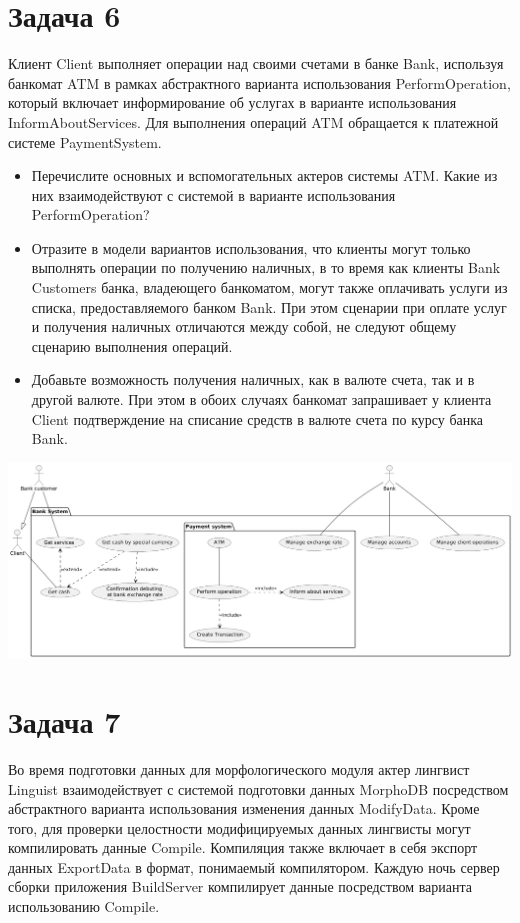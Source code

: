 \documentclass{article}
\begin{document}
\section{Задача 6}
Клиент Client выполняет операции над своими счетами в банке Bank, используя банкомат ATM в рамках абстрактного варианта использования PerformOperation, который включает информирование об услугах в варианте использования InformAboutServices. Для выполнения операций ATM обращается к платежной системе PaymentSystem.

\begin{itemize}
    \item Перечислите основных и вспомогательных актеров системы ATM. Какие из них взаимодействуют с системой в варианте использования PerformOperation?
    \item Отразите в модели вариантов использования, что клиенты могут только выполнять операции по получению наличных, в то время как клиенты Bank Customers банка, владеющего банкоматом, могут также оплачивать услуги из списка, предоставляемого банком Bank. При этом сценарии при оплате услуг и получения наличных отличаются между собой, не следуют общему сценарию выполнения операций.
    \item Добавьте возможность получения наличных, как в валюте счета, так и в другой валюте. При этом в обоих случаях банкомат запрашивает у клиента Client подтверждение на списание средств в валюте счета по курсу банка Bank.
\end{itemize}

\includegraphics[width=\textwidth]{6.png}

\section{Задача 7}
Во время подготовки данных для морфологического модуля актер лингвист Linguist взаимодействует с системой подготовки данных MorphoDB посредством абстрактного варианта использования изменения данных ModifyData. Кроме того, для проверки целостности модифицируемых данных лингвисты могут компилировать данные Compile. Компиляция также включает в себя экспорт данных ExportData в формат, понимаемый компилятором. Каждую ночь сервер сборки приложения BuildServer компилирует данные посредством варианта использованию Compile.
\end{document}
